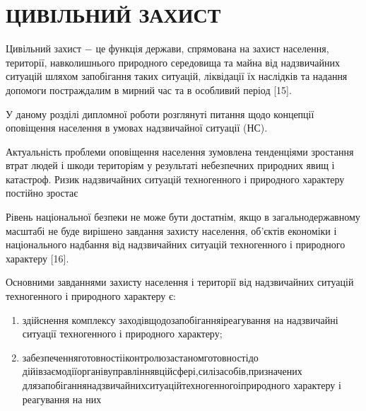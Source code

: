 \section{ЦИВІЛЬНИЙ ЗАХИСТ}

Цивільний захист $-$ це функція держави, спрямована на захист населення, території, навколишнього природного середовища та майна від надзвичайних ситуацій шляхом запобігання таких ситуацій, ліквідації їх наслідків та надання допомоги постраждалим в мирний час та в особливий період [15].

У даному розділі дипломної роботи розглянуті питання щодо концепції оповіщення населення в умовах надзвичайної ситуації (НС).

Актуальність проблеми оповіщення населення зумовлена тенденціями зростання втрат людей і шкоди територіям у результаті небезпечних природних явищ і катастроф. Ризик надзвичайних ситуацій техногенного і природного характеру постійно зростає

Рівень національної безпеки не може бути достатнім, якщо в загальнодержавному масштабі не буде вирішено завдання захисту населення, об'єктів економіки і національного надбання від надзвичайних ситуацій техногенного і природного характеру [16].

Основними завданнями захисту населення і території від надзвичайних ситуацій техногенного і природного характеру є:

\begin{enumerate}
	\item здійснення \hfill комплексу \hfill заходів\hfill щодо\hfill запобігання\hfill і\hfill реагування \newline \hspace*{-20mm} на надзвичайні ситуації техногенного і природного характеру;
	\item забезпечення\hfill готовності\hfill і\hfill контролю\hfill за\hfill станом\hfill готовності\hfill до\newline \hspace*{-20mm} дій\hfill і\hfill взаємодії\hfill органів\hfill управління\hfill в\hfill цій\hfill сфері,\hfill сил\hfill і\hfill засобів,\hfill призначених\newline \hspace*{-20mm} для\hfill запобігання\hfill надзвичайних\hfill ситуацій\hfill техногенного\hfill і\hfill природного\newline \hspace*{-20mm} характеру і реагування на них
\end{enumerate}

